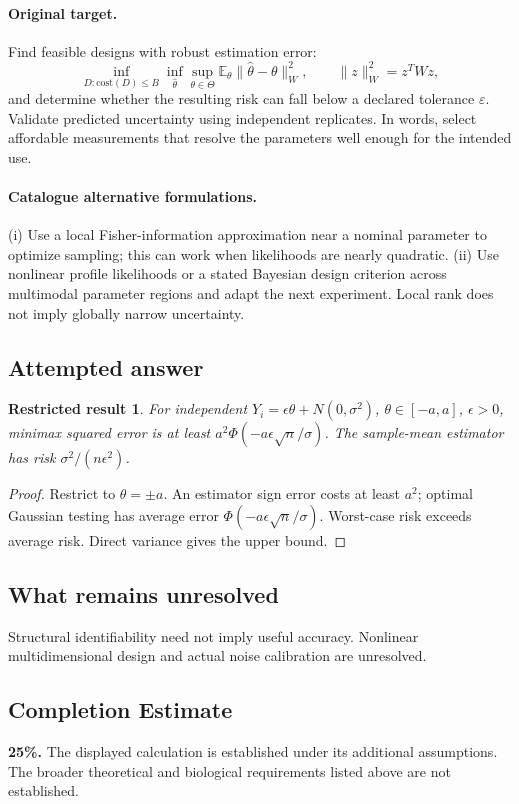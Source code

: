 \documentclass[11pt]{article}
\newcommand{\E}{\mathbb E}
\providecommand{\E}{\mathbb E}
\newtheorem{attemptresult}{Restricted result}[section]
\begin{document}
\paragraph{Original target.}
Find feasible designs with robust estimation error:
\[
\inf_{D:\mathrm{cost}(D)\leq B}\inf_{\widehat\theta}
\sup_{\theta\in\Theta}\E_\theta\|\widehat\theta-\theta\|_W^2,
\qquad \|z\|_W^2=z^TWz,
\]
and determine whether the resulting risk can fall below a declared tolerance $\varepsilon$. Validate predicted uncertainty using independent replicates. In words, select affordable measurements that resolve the parameters well enough for the intended use.
\paragraph{Catalogue alternative formulations.}
(i) Use a local Fisher-information approximation near a nominal parameter to optimize sampling; this can work when likelihoods are nearly quadratic. (ii) Use nonlinear profile likelihoods or a stated Bayesian design criterion across multimodal parameter regions and adapt the next experiment. Local rank does not imply globally narrow uncertainty.
\subsection{Attempted answer}
\begin{attemptresult}
For independent $Y_i=\epsilon\theta+N(0,\sigma^2)$, $\theta\in[-a,a]$, $\epsilon>0$, minimax squared error is at least $a^2\Phi(-a\epsilon\sqrt n/\sigma)$. The sample-mean estimator has risk $\sigma^2/(n\epsilon^2)$.
\end{attemptresult}
\begin{proof}
Restrict to $\theta=\pm a$. An estimator sign error costs at least $a^2$; optimal Gaussian testing has average error $\Phi(-a\epsilon\sqrt n/\sigma)$. Worst-case risk exceeds average risk. Direct variance gives the upper bound.
\end{proof}
\subsection{What remains unresolved}
Structural identifiability need not imply useful accuracy. Nonlinear multidimensional design and actual noise calibration are unresolved.
\subsection{Completion Estimate}
\textbf{25\%.} The displayed calculation is established under its additional assumptions. The broader theoretical and biological requirements listed above are not established.
\end{document}
